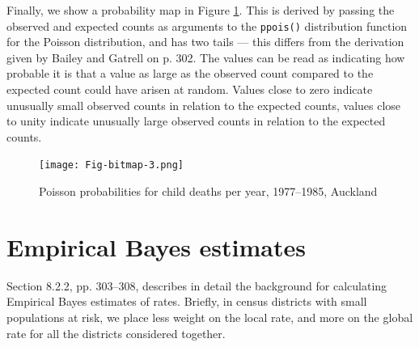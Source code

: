 \documentclass[a4paper,10pt]{article}
\newcommand{\code}[1]{\texttt{\small #1}}
\begin{document}
\begin{footnotesize}
\begin{Schunk}
\end{Schunk}
\begin{Schunk}
\end{Schunk}
\end{footnotesize}
Finally, we show a probability map in Figure \ref{pmap}. This is derived by passing the observed and expected counts as arguments to the \code{ppois()} distribution function for the Poisson distribution, and has two tails --- this differs from the derivation given by Bailey and Gatrell on p. 302. The values can be read as indicating how probable it is that a value as large as the observed count compared to the expected count could have arisen at random. Values close to zero indicate unusually small observed counts in relation to the expected counts, values close to unity indicate unusually large observed counts in relation to the expected counts.

\begin{figure}[htbp]
\begin{center} 
\begin{Schunk}
\texttt{[image: Fig-bitmap-3.png]}\end{Schunk}
\end{center}
\caption{Poisson probabilities for child deaths per year, 1977--1985, Auckland}
\label{pmap}
\end{figure}

\section{Empirical Bayes estimates}

Section 8.2.2, pp. 303--308, describes in detail the background for calculating 
Empirical Bayes estimates of rates. Briefly, in census districts with small populations at risk, we place less weight on the local rate, and more on the global rate for all the districts considered together. 
\end{document}
